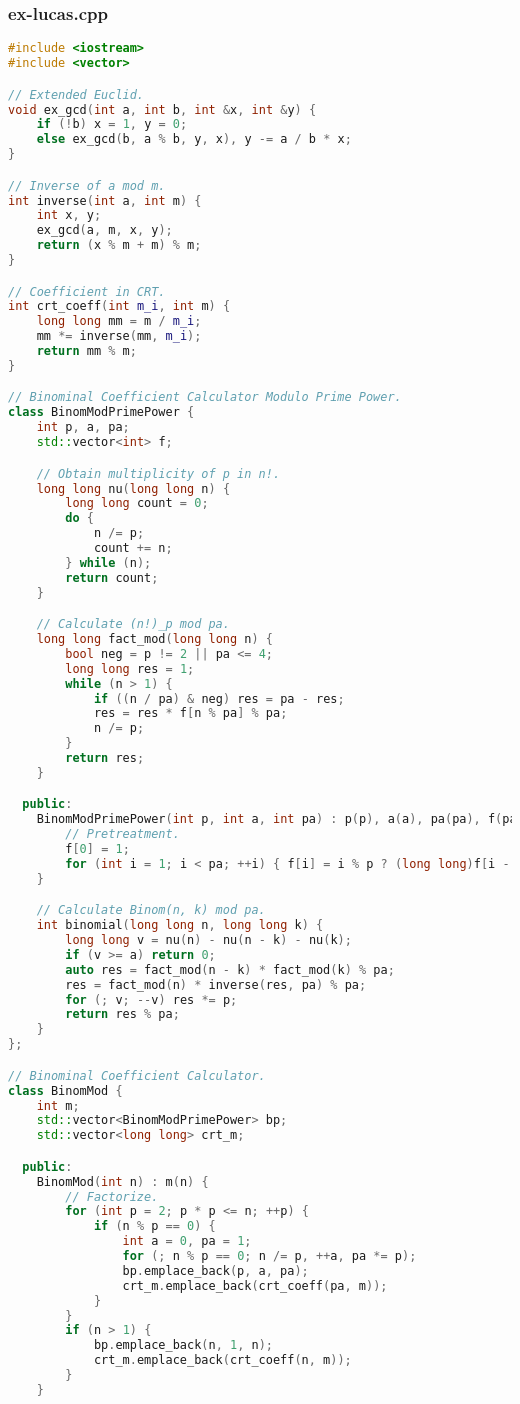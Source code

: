 \documentclass[9pt, a4paper, oneside]{book}
\begin{document}
\subsubsection{ex-lucas.cpp}
\begin{lstlisting}[language={C++}]
#include <iostream>
#include <vector>

// Extended Euclid.
void ex_gcd(int a, int b, int &x, int &y) {
    if (!b) x = 1, y = 0;
    else ex_gcd(b, a % b, y, x), y -= a / b * x;
}

// Inverse of a mod m.
int inverse(int a, int m) {
    int x, y;
    ex_gcd(a, m, x, y);
    return (x % m + m) % m;
}

// Coefficient in CRT.
int crt_coeff(int m_i, int m) {
    long long mm = m / m_i;
    mm *= inverse(mm, m_i);
    return mm % m;
}

// Binominal Coefficient Calculator Modulo Prime Power.
class BinomModPrimePower {
    int p, a, pa;
    std::vector<int> f;

    // Obtain multiplicity of p in n!.
    long long nu(long long n) {
        long long count = 0;
        do {
            n /= p;
            count += n;
        } while (n);
        return count;
    }

    // Calculate (n!)_p mod pa.
    long long fact_mod(long long n) {
        bool neg = p != 2 || pa <= 4;
        long long res = 1;
        while (n > 1) {
            if ((n / pa) & neg) res = pa - res;
            res = res * f[n % pa] % pa;
            n /= p;
        }
        return res;
    }

  public:
    BinomModPrimePower(int p, int a, int pa) : p(p), a(a), pa(pa), f(pa) {
        // Pretreatment.
        f[0] = 1;
        for (int i = 1; i < pa; ++i) { f[i] = i % p ? (long long)f[i - 1] * i % pa : f[i - 1]; }
    }

    // Calculate Binom(n, k) mod pa.
    int binomial(long long n, long long k) {
        long long v = nu(n) - nu(n - k) - nu(k);
        if (v >= a) return 0;
        auto res = fact_mod(n - k) * fact_mod(k) % pa;
        res = fact_mod(n) * inverse(res, pa) % pa;
        for (; v; --v) res *= p;
        return res % pa;
    }
};

// Binominal Coefficient Calculator.
class BinomMod {
    int m;
    std::vector<BinomModPrimePower> bp;
    std::vector<long long> crt_m;

  public:
    BinomMod(int n) : m(n) {
        // Factorize.
        for (int p = 2; p * p <= n; ++p) {
            if (n % p == 0) {
                int a = 0, pa = 1;
                for (; n % p == 0; n /= p, ++a, pa *= p);
                bp.emplace_back(p, a, pa);
                crt_m.emplace_back(crt_coeff(pa, m));
            }
        }
        if (n > 1) {
            bp.emplace_back(n, 1, n);
            crt_m.emplace_back(crt_coeff(n, m));
        }
    }


\end{lstlisting}
\end{document}
